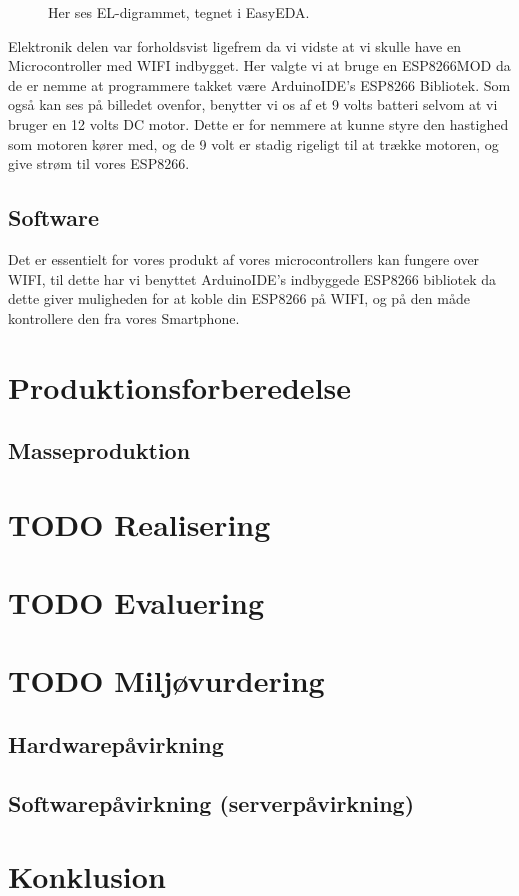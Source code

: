 \documentclass[11pt]{article}
\begin{document}
\begin{figure}[htbp]
    \centering
    \caption{Her ses EL-digrammet, tegnet i EasyEDA. }
    \end{figure}

Elektronik delen var forholdsvist ligefrem da vi vidste at vi skulle have en Microcontroller med WIFI indbygget. Her valgte vi at bruge en ESP8266MOD da de er nemme at programmere takket være ArduinoIDE's ESP8266 Bibliotek. Som også kan ses på billedet ovenfor, benytter vi os af et 9 volts batteri selvom at vi bruger en 12 volts DC motor. Dette er for nemmere at kunne styre den hastighed som motoren kører med, og de 9 volt er stadig rigeligt til at trække motoren, og give strøm til vores ESP8266.


\subsection{Software}
Det er essentielt for vores produkt af vores microcontrollers kan fungere over WIFI, til dette har vi benyttet ArduinoIDE's indbyggede ESP8266 bibliotek da dette giver muligheden for at koble din ESP8266 på WIFI, og på den måde kontrollere den fra vores Smartphone.

\section{Produktionsforberedelse}
\label{sec:orge880538}
\subsection{Masseproduktion}
\label{sec:orge66eada}
\section{{\bfseries\sffamily TODO} Realisering}
\label{sec:orgd4c9e64}
\section{{\bfseries\sffamily TODO} Evaluering}
\label{sec:org4ddb451}
\section{{\bfseries\sffamily TODO} Miljøvurdering}
\label{sec:org9bb106c}
\subsection{Hardwarepåvirkning}
\label{sec:org9e89a3f}
\subsection{Softwarepåvirkning (serverpåvirkning)}
\label{sec:org15c2cb6}
\section{Konklusion}
\label{sec:org7454aed}
\end{document}
